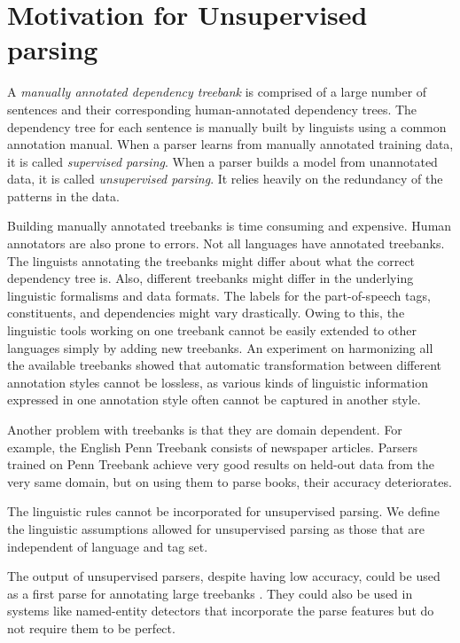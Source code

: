 \documentclass{book}
\begin{document}
\section{Motivation for Unsupervised parsing}

A \textit{manually annotated dependency treebank} is comprised of a large number of sentences and their corresponding human-annotated dependency trees. The dependency tree for each sentence is manually built by linguists using a common annotation manual. When a parser learns from manually annotated training data, it is called \textit{supervised parsing}. When a parser builds a model from unannotated data, it is called \textit{unsupervised parsing}. It relies heavily on the redundancy of the patterns in the data.

Building manually annotated treebanks is time consuming and expensive. Human annotators are also prone to errors. Not all languages have annotated treebanks. The linguists annotating the treebanks might differ about what the correct dependency tree is. Also, different treebanks might differ in the underlying linguistic formalisms and data formats. The labels for the part-of-speech tags, constituents, and dependencies might vary drastically. Owing to this, the linguistic tools working on one treebank cannot be easily extended to other languages simply by adding new treebanks. An experiment on harmonizing all the available treebanks \citep{zeman2012} showed that automatic transformation between different annotation styles cannot be lossless, as various kinds of linguistic information expressed in one annotation style often cannot be captured in another style.

Another problem with treebanks is that they are domain dependent. For example, the English Penn Treebank \citep{marcus1994} consists of newspaper articles. Parsers trained on Penn Treebank achieve very good results on held-out data from the very same domain, but on using them to parse books, their accuracy deteriorates. 

The linguistic rules cannot be incorporated for unsupervised parsing.  We define the linguistic assumptions allowed for unsupervised parsing as those that are independent of language and tag set.

The output of unsupervised parsers, despite having low accuracy, could be used as a first parse for annotating large treebanks \citep{vanzaanen2000}. They could also be used in systems like named-entity detectors that incorporate the parse features but do not require them to be perfect.
\end{document}
